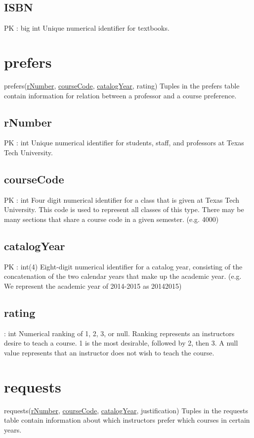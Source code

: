 	\subsection{ISBN}
 		PK : big int  
 		Unique numerical identifier for textbooks.
	
	
\section{prefers}
	prefers(\underline{rNumber}, \underline{courseCode}, \underline{catalogYear}, rating) 
		Tuples in the prefers table contain information for relation between a professor and a course preference.
	
	\subsection{rNumber}
		PK : int 
		Unique numerical identifier for students, staff, and professors at Texas Tech University.
	
	\subsection{courseCode}
		PK : int
		Four digit numerical identifier for a class that is given at Texas Tech University. This code is used to represent all classes of this type. There may be many sections that share a course code in a given semester. (e.g. 4000)
	
	\subsection{catalogYear}
		PK : int(4) 
		Eight-digit numerical identifier for a catalog year, consisting of the concatenation of the two calendar years that make up the academic year. (e.g. We represent the academic year of 2014-2015 as 20142015)
	
	\subsection{rating}
		: int 
		Numerical ranking of 1, 2, 3, or null. Ranking represents an instructors desire to teach a course. 1 is the most desirable, followed by 2, then 3. A null value represents that an instructor does not wish to teach the course. 


\section{requests}
	requests(\underline{rNumber}, \underline{courseCode}, \underline{catalogYear}, justification) 
		Tuples in the requests table contain information about which instructors prefer which courses in certain years.
	
